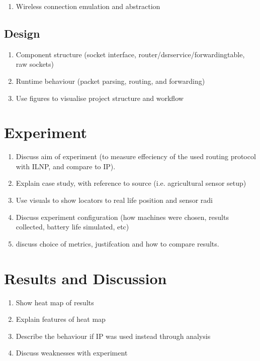 \documentclass[12pt]{article}
\begin{document}
\begin{enumerate}
    \item Wireless connection emulation and abstraction
\end{enumerate}

\subsection{Design}

\begin{enumerate}
\item Component structure (socket interface, router/dsrservice/forwardingtable, raw sockets)
\item Runtime behaviour (packet parsing, routing, and forwarding)
\item Use figures to visualise project structure and workflow
\end{enumerate}

\section{Experiment}

\begin{enumerate}
\item Discuss aim of experiment (to measure effeciency of the used routing protocol with ILNP, and compare to IP).
\item Explain case study, with reference to source (i.e. agricultural sensor setup)
\item Use visuals to show locators to real life position and sensor radi
\item Discuss experiment configuration (how machines were chosen, results collected, battery life simulated, etc)
\item discuss choice of metrics, justifcation and how to compare results.
\end{enumerate}

\section{Results and Discussion}

\begin{enumerate}
\item Show heat map of results
\item Explain features of heat map
\item Describe the behaviour if IP was used instead through analysis
\item Discuss weaknesses with experiment
\end{enumerate}
\end{document}
